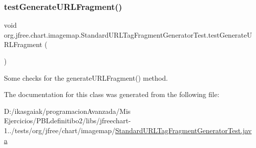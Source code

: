 \subsubsection{\texorpdfstring{test\+Generate\+U\+R\+L\+Fragment()}{testGenerateURLFragment()}}
{\footnotesize\ttfamily void org.\+jfree.\+chart.\+imagemap.\+Standard\+U\+R\+L\+Tag\+Fragment\+Generator\+Test.\+test\+Generate\+U\+R\+L\+Fragment (\begin{DoxyParamCaption}{ }\end{DoxyParamCaption})}

Some checks for the generate\+U\+R\+L\+Fragment() method. 

The documentation for this class was generated from the following file\+:\begin{DoxyCompactItemize}
\item 
D\+:/ikasgaiak/programacion\+Avanzada/\+Mis Ejercicios/\+P\+B\+Ldefinitibo2/libs/jfreechart-\/1../tests/org/jfree/chart/imagemap/\mbox{\hyperlink{_standard_u_r_l_tag_fragment_generator_test_8java}{Standard\+U\+R\+L\+Tag\+Fragment\+Generator\+Test.\+java}}\end{DoxyCompactItemize}
